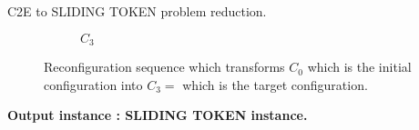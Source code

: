 \begin{example}{C2E to SLIDING TOKEN problem reduction. \\}
\begin{figure}[H]
\begin{subfigure}[b]{0.4\textwidth}
\begin{scaletikzpicturetowidth}{\textwidth}
    \end{scaletikzpicturetowidth}
    \caption{$C_3$}
    \label{fig:input_instance_3}
  \end{subfigure}
  \caption{Reconfiguration sequence which transforms $C_0$ which is the initial configuration into $C_3 = $ which is the target configuration.}
  \label{fig:input_instance_config_to_edge}
\end{figure}

\textbf{Output instance : SLIDING TOKEN instance.} \hfill


\end{example}
